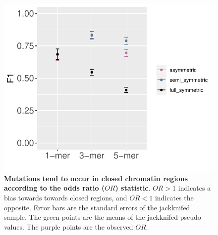 \begin{figure}[h!]
    \centering
    \includegraphics[scale=1]{graphics/f1_sce.pdf}
    \caption{\textbf{Mutations tend to occur in closed chromatin regions according to the odds ratio ($OR$) statistic}. $OR>1$ indicates a bias towards towards closed regions, and $OR<1$ indicates the opposite. Error bars are the standard errors of the jackknifed sample. The green points are the means of the jackknifed pseudo-values. The purple points are the observed $OR$.}
    \label{fig:f1_sce}
\end{figure}
